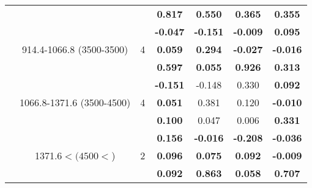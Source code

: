\begin{table}[htbp]
\begin{tabular}{rrrcccc}
    \multicolumn{1}{c}{} & \multicolumn{1}{c}{} & \multicolumn{1}{c}{} & \textbf{0.817 } & \textbf{0.550 } & \textbf{0.365 } & \textbf{0.355 } \bigstrut\\\cline{4-7}\noalign{\smallskip}
    \multicolumn{1}{c}{\multirow{3}[2]{*}{4}} & \multicolumn{1}{c}{\multirow{3}[2]{2.5cm}{914.4-1066.8 (3500-3500)}} & \multicolumn{1}{c}{\multirow{3}[2]{*}{4}} & \textbf{-0.047 } & \textbf{-0.151 } & \textbf{-0.009 } & \textbf{0.095 } \\
    \multicolumn{1}{c}{} & \multicolumn{1}{c}{} & \multicolumn{1}{c}{} & \textbf{0.059 } & \textbf{0.294 } & \textbf{-0.027 } & \textbf{-0.016 } \\
    \multicolumn{1}{c}{} & \multicolumn{1}{c}{} & \multicolumn{1}{c}{} & \textbf{0.597 } & \textbf{0.055 } & \textbf{0.926 } & \textbf{0.313 } \bigstrut\\\cline{4-7}\noalign{\smallskip}
    \multicolumn{1}{c}{\multirow{3}[2]{*}{5}} & \multicolumn{1}{c}{\multirow{3}[2]{2.5cm}{1066.8-1371.6 (3500-4500)}} & \multicolumn{1}{c}{\multirow{3}[2]{*}{4}} & \textbf{-0.151 } & -0.148  & 0.330  & \textbf{0.092 } \\
    \multicolumn{1}{c}{} & \multicolumn{1}{c}{} & \multicolumn{1}{c}{} & \textbf{0.051 } & 0.381  & 0.120  & \textbf{-0.010 } \\
    \multicolumn{1}{c}{} & \multicolumn{1}{c}{} & \multicolumn{1}{c}{} & \textbf{0.100 } & 0.047  & 0.006  & \textbf{0.331 } \bigstrut\\\cline{4-7}\noalign{\smallskip}
    \multicolumn{1}{c}{\multirow{3}[2]{*}{6}} & \multicolumn{1}{c}{\multirow{3}[2]{2.5cm}{1371.6$< (4500<$)}} & \multicolumn{1}{c}{\multirow{3}[2]{*}{2}} & \textbf{0.156 } & \textbf{-0.016 } & \textbf{-0.208 } & \textbf{-0.036 } \\
    \multicolumn{1}{c}{} & \multicolumn{1}{c}{} & \multicolumn{1}{c}{} & \textbf{0.096 } & \textbf{0.075 } & \textbf{0.092 } & \textbf{-0.009 } \\
    \multicolumn{1}{c}{} & \multicolumn{1}{c}{} & \multicolumn{1}{c}{} & \textbf{0.092 } & \textbf{0.863 } & \textbf{0.058 } & \textbf{0.707 } \\
    \bottomrule
    \end{tabular}%
  \label{tab:Set1TVJD}%
\end{table}%
